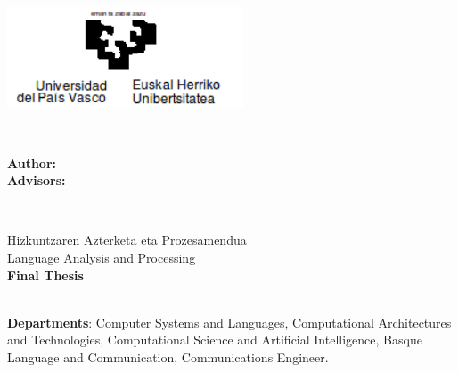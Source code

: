 \newcommand {\deltitle}{ \LARGE {\textbf{\Title}}}
\DocTitle{\ShortTitle}
\DocDate{\Date}

\addto\captionsbasque{%
  \renewcommand{\contentsname}{Contents}%
  \renewcommand{\listfigurename}{List of figures}%
  \renewcommand{\listtablename}{List of tables}%
}




\begin{titlepage}
{ \center
  \begin{minipage}{\textwidth}
    \centering
    \includegraphics[height=3cm]{Control/UPV_control/UPV_utils/common/ehuLogo.png}
  \end{minipage}
}\\[60pt]

\begin{minipage}[t][4cm][c]{\textwidth}
  \center
  \deltitle
{ \large \textbf{Author:} \Authors }\\
{ \large \textbf{Advisors:} \Tutor}\ \\
\vspace{0.5cm}
\end{minipage}\\
\begin{center}
\end{center}

\vspace{0.3cm}
\begin{center}
  Hizkuntzaren Azterketa eta Prozesamendua\\Language Analysis and Processing\\
\vspace{0.3cm}
  {\Large \textbf{Final Thesis}}
\end{center}
\vspace{0.1cm}
\begin{center}
  \Date
\end{center}
\HRule \\[0.3cm]
{ \textbf{Departments}: Computer Systems and Languages, Computational Architectures and Technologies, Computational Science and Artificial Intelligence, Basque Language and Communication, Communications Engineer. }\\[0.3cm]
 \HRule \\[0.5cm]

\end{titlepage}
